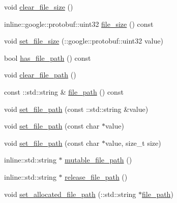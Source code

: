 \begin{DoxyCompactItemize}
\item 
void \hyperlink{class_i_m_1_1_base_define_1_1_client_offline_file_info_a825f2ac1f56b02a870bb8d4f4ac4cc65}{clear\+\_\+file\+\_\+size} ()
\item 
inline\+::google\+::protobuf\+::uint32 \hyperlink{class_i_m_1_1_base_define_1_1_client_offline_file_info_a34fb426d9a3b157c0ead6edbbd29bbca}{file\+\_\+size} () const 
\item 
void \hyperlink{class_i_m_1_1_base_define_1_1_client_offline_file_info_a27d899ed8dc735cff168bb84438a231e}{set\+\_\+file\+\_\+size} (\+::google\+::protobuf\+::uint32 value)
\item 
bool \hyperlink{class_i_m_1_1_base_define_1_1_client_offline_file_info_a960f38c80700a08aec93c55fb97792ba}{has\+\_\+file\+\_\+path} () const 
\item 
void \hyperlink{class_i_m_1_1_base_define_1_1_client_offline_file_info_aedef212c7a011112170de309bd81b7ac}{clear\+\_\+file\+\_\+path} ()
\item 
const \+::std\+::string \& \hyperlink{class_i_m_1_1_base_define_1_1_client_offline_file_info_a2a085b73d9389bab19f5383dd01e7349}{file\+\_\+path} () const 
\item 
void \hyperlink{class_i_m_1_1_base_define_1_1_client_offline_file_info_a6c4b937471b4bf60c9c9315fd4304238}{set\+\_\+file\+\_\+path} (const \+::std\+::string \&value)
\item 
void \hyperlink{class_i_m_1_1_base_define_1_1_client_offline_file_info_a3d24d352a7ffd8256a9697aa34b86a0e}{set\+\_\+file\+\_\+path} (const char $\ast$value)
\item 
void \hyperlink{class_i_m_1_1_base_define_1_1_client_offline_file_info_a78149ae9d8959898caba132982d6245a}{set\+\_\+file\+\_\+path} (const char $\ast$value, size\+\_\+t size)
\item 
inline\+::std\+::string $\ast$ \hyperlink{class_i_m_1_1_base_define_1_1_client_offline_file_info_a6cb54d6f018bb9f588acfc226878ab08}{mutable\+\_\+file\+\_\+path} ()
\item 
inline\+::std\+::string $\ast$ \hyperlink{class_i_m_1_1_base_define_1_1_client_offline_file_info_af383eca52d40da2b7d1ec0f42086497f}{release\+\_\+file\+\_\+path} ()
\item 
void \hyperlink{class_i_m_1_1_base_define_1_1_client_offline_file_info_a80592f93acfac84791d1da7638022972}{set\+\_\+allocated\+\_\+file\+\_\+path} (\+::std\+::string $\ast$\hyperlink{class_i_m_1_1_base_define_1_1_client_offline_file_info_a2a085b73d9389bab19f5383dd01e7349}{file\+\_\+path})
\end{DoxyCompactItemize}
